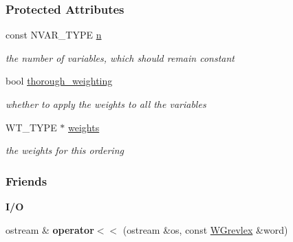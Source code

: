 \subsubsection*{Protected Attributes}
\begin{DoxyCompactItemize}
\item 
\mbox{\label{group__orderinggroup_ac8355eb8a2145189fba8dcec4b47a22f}} 
const N\+V\+A\+R\+\_\+\+T\+Y\+PE \hyperlink{group__orderinggroup_ac8355eb8a2145189fba8dcec4b47a22f}{n}
\begin{DoxyCompactList}\small\item\em the number of variables, which should remain constant \end{DoxyCompactList}\item 
\mbox{\label{group__orderinggroup_a73b55333b66eae11ee2e781c166b2421}} 
bool \hyperlink{group__orderinggroup_a73b55333b66eae11ee2e781c166b2421}{thorough\+\_\+weighting}
\begin{DoxyCompactList}\small\item\em whether to apply the weights to all the variables \end{DoxyCompactList}\item 
\mbox{\label{group__orderinggroup_a8a8d248da57c37bff15fe9400b1e04ff}} 
W\+T\+\_\+\+T\+Y\+PE $\ast$ \hyperlink{group__orderinggroup_a8a8d248da57c37bff15fe9400b1e04ff}{weights}
\begin{DoxyCompactList}\small\item\em the weights for this ordering \end{DoxyCompactList}\end{DoxyCompactItemize}
\subsubsection*{Friends}
\begin{Indent}\textbf{ I/O}\par
\begin{DoxyCompactItemize}
\item 
\mbox{\label{group__orderinggroup_ad3b0454837c3ced9ffcd168bda55484b}} 
ostream \& {\bfseries operator$<$$<$} (ostream \&os, const \hyperlink{group__orderinggroup_class_w_grevlex}{W\+Grevlex} \&word)
\end{DoxyCompactItemize}
\end{Indent}


